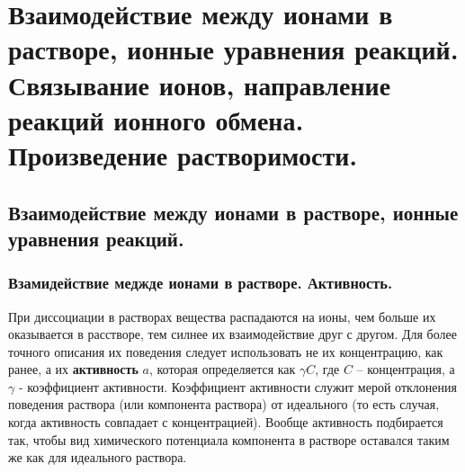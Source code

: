 \section{Взаимодействие между ионами в растворе, ионные уравнения реакций. Связывание ионов, направление реакций ионного обмена. Произведение растворимости.}
\subsection{Взаимодействие между ионами в растворе, ионные уравнения реакций.}
\subsubsection{Взамидействие меджде ионами в растворе. Активность.}
При диссоциации в растворах вещества распадаются на ионы, чем больше их оказывается в расстворе, тем силнее их взаимодействие друг с другом. Для более точного описания их поведения следует использовать не их концентрацию, как ранее, а их \textbf{активность} $a$, которая определяется как $\gamma C$, где $C$ -- концентрация, а $\gamma$ - коэффициент активности. Коэффициент активности служит мерой отклонения поведения раствора (или компонента раствора) от идеального (то есть случая, когда активность совпадает с концентрацией). Вообще активность подбирается так, чтобы вид химического потенциала компонента в растворе оставался таким же как для идеального раствора.
